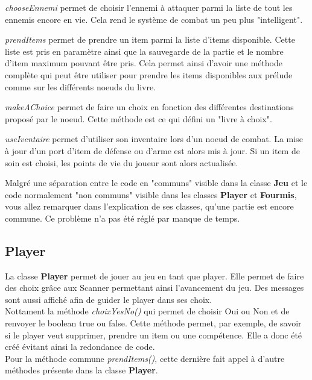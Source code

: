 		\textit{chooseEnnemi} permet de choisir l'ennemi à attaquer parmi la liste de tout les ennemis encore en vie. Cela rend le système de combat un peu plus "intelligent".

		\textit{prendItems} permet de prendre un item parmi la liste d'items disponible. Cette liste est pris en paramètre ainsi que la sauvegarde de la partie et le nombre d'item maximum pouvant être pris. Cela permet ainsi d'avoir une méthode complète qui peut être utiliser pour prendre les items disponibles aux prélude comme sur les différents noeuds du livre.

		\textit{makeAChoice} permet de faire un choix en fonction des différentes destinations proposé par le noeud. Cette méthode est ce qui défini un "livre à choix".

		\textit{useIventaire} permet d'utiliser son inventaire lors d'un noeud de combat. La mise à jour d'un port d'item de défense ou d'arme est alors mis à jour. Si un item de soin est choisi, les points de vie du joueur sont alors actualisée.

		Malgré une séparation entre le code en "communs" visible dans la classe \textbf{Jeu} et le code normalement "non communs" visible dans les classes \textbf{Player} et \textbf{Fourmis}, vous allez remarquer dans l'explication de ses classes, qu'une partie est encore commune. Ce problème n'a pas été réglé par manque de temps.

	\subsection{Player}\label{sub:player}
		La classe \textbf{Player} permet de jouer au jeu en tant que player. Elle permet de faire des choix grâce aux Scanner permettant ainsi l'avancement du jeu. Des messages sont aussi affiché afin de guider le player dans ses choix.\\
		Nottament la méthode \textit{choixYesNo()} qui permet de choisir Oui ou Non et de renvoyer le boolean true ou false. Cette méthode permet, par exemple, de savoir si le player veut supprimer, prendre un item ou une compétence. Elle a donc été créé évitant ainsi la redondance de code.\\

		Pour la méthode commune \textit{prendItems()}, cette dernière fait appel à d'autre méthodes présente dans la classe \textbf{Player}.

